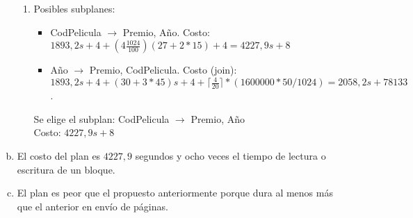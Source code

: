 \documentclass[10pt]{article}
\begin{document}
\begin{enumerate}[a.]
\begin{enumerate}[1:]
 \item Posibles subplanes:
    \begin{itemize}
     \item CodPelicula $\rightarrow$  Premio, Año. Costo: $1893,2s+4+(4\frac{1024}{100})(27+2*15)+4 = 4227,9s+8$
     \item Año $\rightarrow$ Premio, CodPelicula. Costo (join): $1893,2s+4+(30+3*45)s+4+\lceil \frac{4}{20} \rceil*(1600000*50/1024) =
           2058,2s + 78133$.
    \end{itemize}

    Se elige el subplan: CodPelicula $\rightarrow$  Premio, Año \\
    Costo: $4227,9s+8$

 \end{enumerate}

 \item El costo del plan es $4227,9$ segundos y ocho veces el tiempo de lectura o escritura de un bloque.

 \item El plan es peor que el propuesto anteriormente porque dura al menos más que el anterior en envío de páginas.

\end{enumerate}
\end{document}
